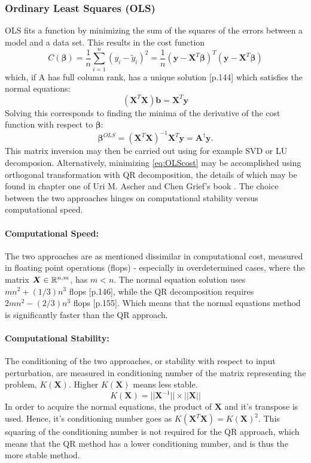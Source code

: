 \documentclass[%
oneside,                 %
final,                   %
10pt]{article}
\begin{document}
\subsubsection{Ordinary Least Squares (OLS)}
OLS fits a function by minimizing the sum of the squares of the errors between a model and a data set. This results in the cost function 
\begin{equation}
C(\bm{\beta})=\frac{1}{n}\sum_{i=1}^n(y_i-\tilde{y}_i)^2=\frac{1}{n}(\bm{y}-\bm{X}^T\bm{\beta})^T(\bm{y}-\bm{X}^T\bm{\beta})
\label{eq:OLScost}
\end{equation}
which, if A has full column rank, has a unique solution \citep{Ascher}[p.144] which satisfies the normal equations:
\begin{equation}
(\bm{X}^T\bm{X})\bm{b}=\bm{X}^T \bm{y}
\label{eq:normeq}
\end{equation}
Solving this corresponds to finding the minima of the derivative of the cost function with respect to $\bm{\beta}$:
\begin{equation}
\bm{\beta}^{OLS}= (\bm{X}^T\bm{X})^{-1}\bm{X}^T \bm{y}=\bm{A}^{\dagger}\bm{y}.
\end{equation}
This matrix inversion may then be carried out using for example SVD or LU decomposion. Alternatively, minimizing \eqref{eq:OLScost} may be accomplished using orthogonal transformation with QR decomposition, the details of which may be found in chapter one of Uri M. Ascher and Chen Grief's book  \cite{Ascher}. The choice between the two approaches hinges on computational stability versus computational speed.

\paragraph*{Computational Speed:}
The two approaches are as mentioned dissimilar in computational cost, measured in floating point operations (flops) - especially in overdetermined cases, where the matrix $\bm{X}\in {\Bbb R}^{n,m}$, has $m<n$.
The normal equation solution uses $mn^2
+ (1/3)n^3$ flops \citep{Ascher}[p.146], while the QR decomposition requires $2mn^2−(2/3)n^3$ flops  \citep{Ascher}[p.155]. Which means that the normal equations method is significantly faster than the QR approach.


\paragraph*{Computational Stability:}
The conditioning of the two approaches, or stability with respect to input perturbation, are measured in conditioning number of the matrix representing the problem, $K(\bm{X})$. Higher $K(\bm{X})$ means less stable. 
\begin{equation}
K(\bm{X})=||\bm{X}^{-1}|| \times ||\bm{X}||
\end{equation}
In order to acquire the normal equations, the product of $\bm{X}$ and it's transpose is used. Hence, it's conditioning number goes as $K(\bm{X}^T\bm{X})=K(\bm{X})^2$. This squaring of the conditioning number is not required for the QR approach, which means that the QR method has a lower conditioning number, and is thus the more stable method.
\end{document}
